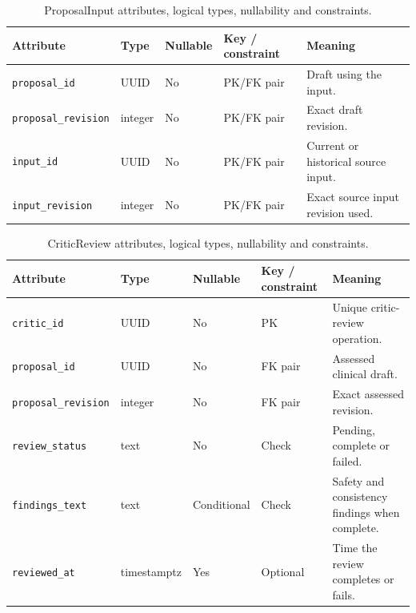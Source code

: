 \begin{table}[htbp]
\setlength{\tabcolsep}{5pt}
\centering
\small
\caption{ProposalInput attributes, logical types, nullability and constraints.}
\label{tab:kashaf:dict-proposalinput}
\begin{tabular}{|p{}|p{}|p{}|p{}|p{}|}
\hline
Attribute & Type & Nullable & Key / constraint & Meaning \\ \hline
\texttt{proposal\_id} & UUID & No & PK/FK pair & Draft using the input. \\ \hline
\texttt{proposal\_revision} & integer & No & PK/FK pair & Exact draft revision. \\ \hline
\texttt{input\_id} & UUID & No & PK/FK pair & Current or historical source input. \\ \hline
\texttt{input\_revision} & integer & No & PK/FK pair & Exact source input revision used. \\ \hline
\end{tabular}
\end{table}

\begin{table}[htbp]
\setlength{\tabcolsep}{5pt}
\centering
\small
\caption{CriticReview attributes, logical types, nullability and constraints.}
\label{tab:kashaf:dict-criticreview}
\begin{tabular}{|p{}|p{}|p{}|p{}|p{}|}
\hline
Attribute & Type & Nullable & Key / constraint & Meaning \\ \hline
\texttt{critic\_id} & UUID & No & PK & Unique critic-review operation. \\ \hline
\texttt{proposal\_id} & UUID & No & FK pair & Assessed clinical draft. \\ \hline
\texttt{proposal\_revision} & integer & No & FK pair & Exact assessed revision. \\ \hline
\texttt{review\_status} & text & No & Check & Pending, complete or failed. \\ \hline
\texttt{findings\_text} & text & Conditional & Check & Safety and consistency findings when complete. \\ \hline
\texttt{reviewed\_at} & timestamptz & Yes & Optional & Time the review completes or fails. \\ \hline
\end{tabular}
\end{table}

